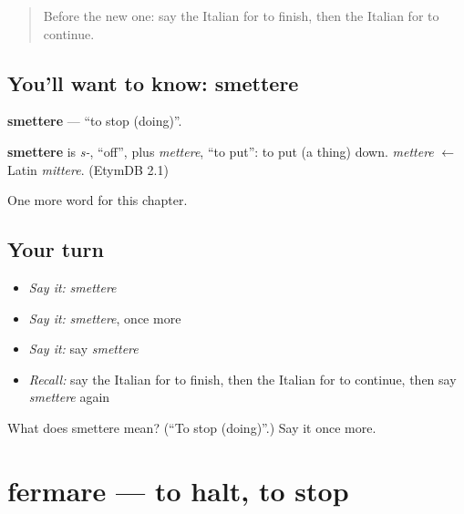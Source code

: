 \label{lesson:IT-C205-smettere}



\begin{quote}
Before the new one: say the Italian for to finish, then the Italian for to continue.
\end{quote}

\subsection*{You'll want to know: smettere}
\textbf{smettere} — \textquotedblleft{}to stop (doing)\textquotedblright{}.

\begin{cousinweb}
\textbf{smettere} is \emph{s-}, \textquotedblleft{}off\textquotedblright{}, plus \emph{mettere}, \textquotedblleft{}to put\textquotedblright{}: to put (a thing) down. \emph{mettere} $\leftarrow$ Latin \emph{mittere}. (EtymDB 2.1)
\end{cousinweb}

\begin{grammarlens}[title={What you've built}]
One more word for this chapter.
\end{grammarlens}

\subsection*{Your turn}
\begin{itemize}
\raggedright
  \item \emph{Say it:} \emph{smettere}
  \item \emph{Say it:} \emph{smettere}, once more
  \item \emph{Say it:} say \emph{smettere}
  \item \emph{Recall:} say the Italian for to finish, then the Italian for to continue, then say \emph{smettere} again
\end{itemize}

\begin{tcolorbox}[breakable,colback=teal!4,colframe=teal!35!black,title={Before you move on}]
What does smettere mean? (\textquotedblleft{}To stop (doing)\textquotedblright{}.) Say it once more.
\end{tcolorbox}
\section[fermare]{fermare — to halt, to stop}

\label{lesson:IT-C205-fermare}



